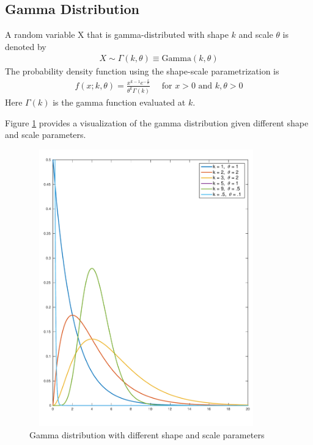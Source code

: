 \subsection{Gamma Distribution} 
\begin{defn} \citep{gamma_distribution_book} A random variable X that is gamma-distributed with shape $k$ and scale $\theta$ is denoted by
\begin{eqnarray*}
X \sim \Gamma(k, \theta) \equiv \textrm{Gamma}(k, \theta)
\end{eqnarray*}
The probability density function using the shape-scale parametrization is
\begin{eqnarray*}
f(x;k,\theta) =  \frac{x^{k - 1}e^{-\frac{x}{\theta}}}{\theta^k\Gamma(k)} \quad \mbox{ for } x > 0 \mbox{ and } k, \theta > 0
\end{eqnarray*}
Here $\Gamma(k)$ is the gamma function evaluated at $k$.
\end{defn}
Figure \ref{fig:gamma_dist}  provides a visualization of the gamma distribution given different shape and scale parameters.
\begin{figure}[h!]
    \centering
    \includegraphics[width=0.9\textwidth, height=12cm]{images/GammaDistribution}
    \caption{Gamma distribution with different shape and scale parameters}
    \label{fig:gamma_dist}
\end{figure}
